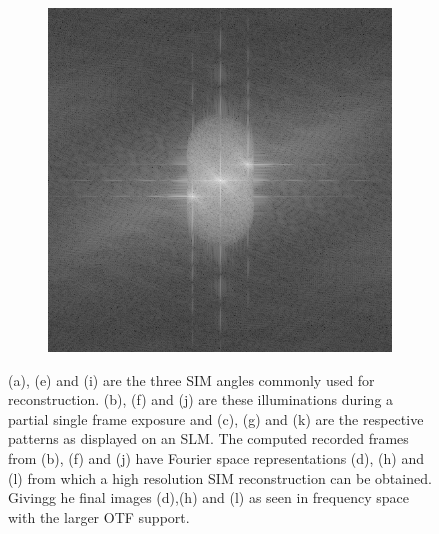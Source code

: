 \begin{figure}[h]
\begin{subfigure}[t]{0.23\textwidth}
        \caption{}
    \end{subfigure}\hfill
    \begin{subfigure}[t]{0.23\textwidth}
        \centering
        \includegraphics[width=\textwidth]{sim_slit/3/fft}
        \caption{}
    \end{subfigure}
  \caption{
  (a), (e) and (i) are the three \gls{SIM} angles commonly used for reconstruction.
  (b), (f) and (j) are these illuminations during a partial single frame exposure and
  (c), (g) and (k) are the respective patterns as displayed on an \gls{SLM}.
  The computed recorded frames from (b), (f) and (j) have Fourier space representations (d), (h) and (l) from which a high resolution \gls{SIM} reconstruction can be obtained.
  Givingg he final images (d),(h) and (l) as seen in frequency space with the larger \gls{OTF} support.
  }\label{fig:sim_slit}
\end{figure}
